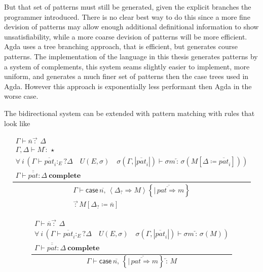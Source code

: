 But that set of patterns must still be generated, given the explicit
branches the programmer introduced. There is no clear best way to
do this since a more fine devision of patterns may allow enough additional
definitional information to show unsatisfiability, while a more coarse
devision of patterns will be more efficient. Agda uses a tree branching
approach, that is efficient, but generates course patterns. The implementation
of the language in this thesis generates patterns by a system of complements,
this system seams slightly easier to implement, more uniform, and
generates a much finer set of patterns then the case trees used in
Agda. However this approach is exponentially less performant then
Agda in the worse case.

The bidirectional system can be extended with pattern matching with
rules that look like 

\[
\frac{\begin{array}{c}
\Gamma\vdash\overline{n}\overrightarrow{\,:\,}\ \Delta\\
\Gamma,\Delta\vdash M\overleftarrow{\,:\,}\star\\
\forall\:i\,\left(\Gamma\vdash\overline{pat}_{i}:_{E}?\Delta\quad U\left(E,\sigma\right)\quad\sigma\left(\Gamma,|\overline{pat}_{i}|\right)\vdash\sigma m\overleftarrow{\,:\,}\sigma\left(M\left[\Delta\coloneqq\overline{pat}_{i}\right]\right)\right)\\
\Gamma\vdash\overline{\overline{pat}}:\Delta\ \mathbf{complete}
\end{array}}{\begin{array}{c}
\Gamma\vdash\mathsf{case}\,\overline{n,}\,\left\langle \Delta_{?}\Rightarrow M\right\rangle \left\{ \overline{|\,\overline{pat\Rightarrow}m}\right\} \\
\overrightarrow{\,:\,}M\left[\Delta_{?}\coloneqq\overline{n}\right]
\end{array}}
\]


\[
\frac{\begin{array}{c}
\Gamma\vdash\overline{n}\overrightarrow{\,:\,}\ \Delta\\
\forall\:i\,\left(\Gamma\vdash\overline{pat}_{i}:_{E}?\Delta\quad U\left(E,\sigma\right)\quad\sigma\left(\Gamma,|\overline{pat}_{i}|\right)\vdash\sigma m\overleftarrow{\,:\,}\sigma\left(M\right)\right)\\
\Gamma\vdash\overline{\overline{pat}}:\Delta\ \mathbf{complete}
\end{array}}{\Gamma\vdash\mathsf{case}\,\overline{n,}\,\left\{ \overline{|\,\overline{pat\Rightarrow}m}\right\} \overleftarrow{\,:\,}M}
\]

